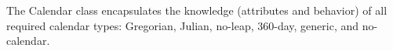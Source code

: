 
The Calendar class encapsulates the knowledge (attributes and behavior) of all
required calendar types:  Gregorian, Julian, no-leap, 360-day, generic, and
no-calendar.
